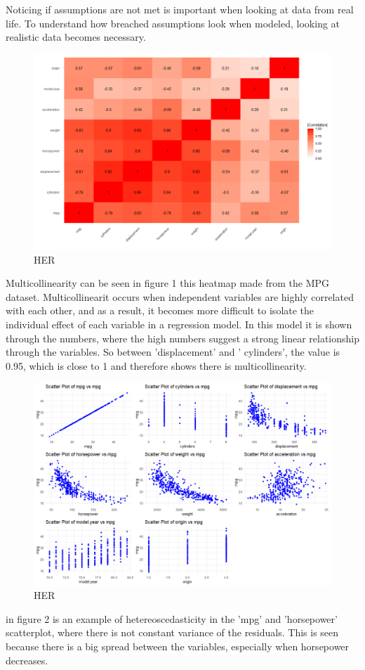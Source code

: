 Noticing if assumptions are not met is important when looking at data from real life.
To understand how breached assumptions look when modeled, looking at realistic data becomes necessary. \newline

\begin{figure}[h!]
	\centering
	\includegraphics[width=\linewidth]{billder/1.png}
	\caption{HER}
	\label{fig:HEAT}
\end{figure}
Multicollinearity can be seen in figure 1 this heatmap made from the MPG dataset. Multicollinearit occurs when independent variables are highly correlated with each other, and as a result, it becomes more difficult to isolate the individual effect of each variable in a regression model.
In this model it is shown through the numbers, where the high numbers suggest a strong linear relationship through the variables. So between 'displacement' and ' cylinders', the value is 0.95, which is close to 1 and therefore shows there is multicollinearity. \newline

\begin{figure}[h!]
	\centering
	\includegraphics[width=\linewidth]{billder/2.png}
	\caption{HER}
	\label{fig:Scatter}
\end{figure}
in figure 2 is an example of hetereoscedasticity in the 'mpg' and 'horsepower' scatterplot, where there is not constant variance of the residuals. This is seen because there is a big spread between the variables, especially when horsepower decreases.   

